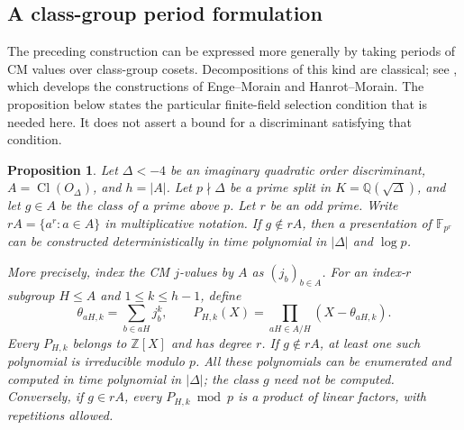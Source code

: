 \documentclass[11pt]{article}
\newtheorem{proposition}[theorem]{Proposition}
\theoremstyle{definition}
\theoremstyle{remark}
\begin{document}
\subsection{A class-group period formulation}

The preceding construction can be expressed more generally by taking
periods of CM values over class-group cosets.  Decompositions of this
kind are classical; see \cite[\S2.5]{Sutherland2012CM}, which develops
the constructions of Enge--Morain and Hanrot--Morain.  The proposition
below states the particular finite-field selection condition that is
needed here.  It does not assert a bound for a discriminant satisfying
that condition.

\begin{proposition}\label{prop:cm-period-gate}
Let $\Delta<-4$ be an imaginary quadratic order discriminant,
$A=\operatorname{Cl}(O_\Delta)$, and $h=|A|$.
Let $p\nmid\Delta$ be a prime split in
$K=\mathbb Q(\sqrt\Delta)$, and let $g\in A$ be the class of a
prime above $p$.
Let $r$ be an odd prime.  Write $rA=\{a^r:a\in A\}$ in
multiplicative notation.  If $g\notin rA$, then a presentation of
$\mathbb F_{p^r}$ can be constructed deterministically in time
polynomial in $|\Delta|$ and $\log p$.

More precisely, index the CM $j$-values by $A$ as $(j_b)_{b\in A}$.
For an index-$r$ subgroup $H\le A$ and $1\le k\le h-1$, define
\[
 \theta_{aH,k}=\sum_{b\in aH}j_b^k,
 \qquad
 P_{H,k}(X)=\prod_{aH\in A/H}(X-\theta_{aH,k}).
\]
Every $P_{H,k}$ belongs to $\mathbb Z[X]$ and has degree $r$.
If $g\notin rA$, at least one such polynomial is irreducible
modulo $p$.
All these polynomials can be enumerated and computed in time
polynomial in $|\Delta|$; the class $g$ need not be computed.
Conversely, if $g\in rA$, every $P_{H,k}\bmod p$ is a product
of linear factors, with repetitions allowed.
\end{proposition}
\end{document}
